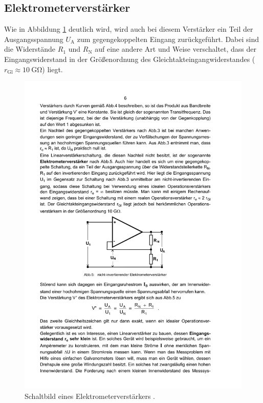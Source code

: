 \subsection{Elektrometerverstärker}
\label{subsec:elektrometerverstärker}
Wie in Abbildung \ref{fig:elektrometer} deutlich wird, wird auch bei diesem
Verstärker ein Teil der Ausgangsspannung $U_\text{A}$ zum gegengekoppelten
Eingang zurückgeführt. Dabei sind die Widerstände $R_1$ und $R_\text{N}$ auf
eine andere Art und Weise verschaltet, dass der Eingangswiderstand in der
Größenordnung des Gleichtakteingangwiderstandes
($r_\text{Gl} \approx \SI{10}{\giga\ohm}$) liegt.
\begin{figure}
    \centering
    \includegraphics[width=0.7\linewidth]{img/elektrometer.pdf}
    \caption{Schaltbild eines Elektrometerverstärkers \cite{V51}.}
    \label{fig:elektrometer}
\end{figure}
